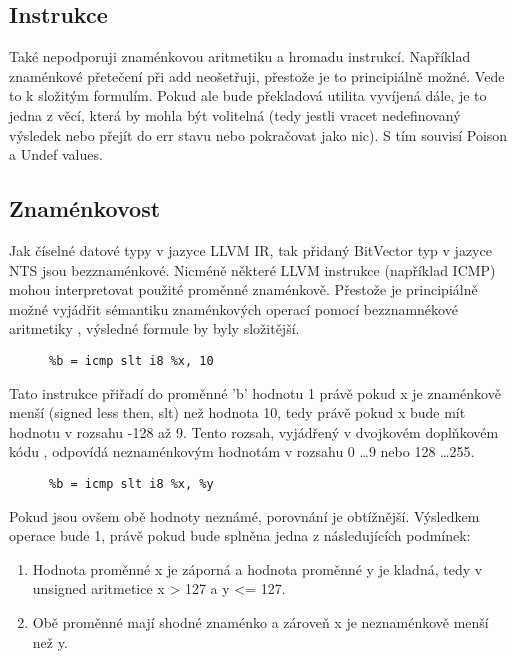 \documentclass[10pt,a4paper,notitlepage]{report}
\begin{document}
\subsection{Instrukce}
Také nepodporuji znaménkovou aritmetiku a hromadu instrukcí. Například znaménkové přetečení při add neošetřuji, přestože je to principiálně možné. Vede to k složitým formulím. Pokud ale bude překladová utilita vyvíjená dále, je to jedna z věcí, která by mohla být volitelná (tedy jestli vracet nedefinovaný výsledek nebo přejít do err stavu nebo pokračovat jako nic). S tím souvisí Poison a Undef values.

\subsection{Znaménkovost}
Jak číselné datové typy v jazyce LLVM IR, tak přidaný BitVector typ v jazyce NTS jsou bezznaménkové. Nicméně některé LLVM instrukce (například ICMP) mohou interpretovat použité proměnné znaménkově. Přestože je principiálně možné vyjádřit sémantiku znaménkových operací pomocí bezznamnékové aritmetiky , výsledné formule by byly složitější. 
\begin{figure}[h!]
\begin{lstlisting}
%b = icmp slt i8 %x, 10
\end{lstlisting}
\end{figure}
Tato instrukce přiřadí do proměnné 'b' hodnotu 1 právě pokud x je znaménkově menší (signed less then, slt) než hodnota 10, tedy právě pokud x bude mít hodnotu v rozsahu -128 až 9. Tento rozsah, vyjádřený v dvojkovém doplňkovém kódu , odpovídá neznaménkovým hodnotám v rozsahu 0 \ldots 9 nebo 128 \ldots 255. 

\begin{figure}[h!]
\begin{lstlisting}
%b = icmp slt i8 %x, %y
\end{lstlisting}
\end{figure}

Pokud jsou ovšem obě hodnoty neznámé, porovnání je obtížnější. Výsledkem operace bude 1, právě pokud bude splněna jedna z následujících podmínek:

\begin{enumerate}
\item Hodnota proměnné x je záporná a hodnota proměnné y je kladná, tedy v unsigned aritmetice x > 127 a y <= 127.
\item Obě proměnné mají shodné znaménko a zároveň x je neznaménkově menší než y.
\end{enumerate}
\end{document}
